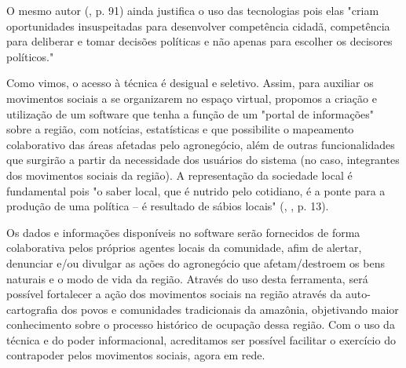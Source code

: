 O mesmo autor (\citeyear{boaventura2005}, p. 91) ainda justifica o uso das tecnologias pois elas "criam oportunidades insuspeitadas para desenvolver competência cidadã, competência para deliberar e tomar decisões políticas e não apenas para escolher os decisores políticos."

Como vimos, o acesso à técnica é desigual e seletivo. Assim, para auxiliar os movimentos sociais a se organizarem no espaço virtual, propomos a criação e utilização de um software que tenha a função de um "portal de informações" sobre a região, com notícias, estatísticas e que possibilite o mapeamento colaborativo das áreas afetadas pelo agronegócio, além de outras funcionalidades que surgirão a partir da necessidade dos usuários do sistema (no caso, integrantes dos movimentos sociais da região). A representação da sociedade local é fundamental pois "o saber local, que é nutrido pelo cotidiano, é a ponte para a produção de uma política – é resultado de sábios locais" (\citeauthor{santos1999}, \citeyear{santos1999}, p. 13). 

Os dados e informações disponíveis no software serão fornecidos de forma colaborativa pelos próprios agentes locais da comunidade, afim de alertar, denunciar e/ou divulgar as ações do agronegócio que afetam/destroem os bens naturais e o modo de vida da região. Através do uso desta ferramenta, será possível fortalecer a ação dos movimentos sociais na região através da auto-cartografia dos povos e comunidades tradicionais da amazônia, objetivando maior conhecimento sobre o processo histórico de ocupação dessa região. Com o uso da técnica e do poder informacional, acreditamos ser possível facilitar o exercício do contrapoder pelos movimentos sociais, agora em rede.


